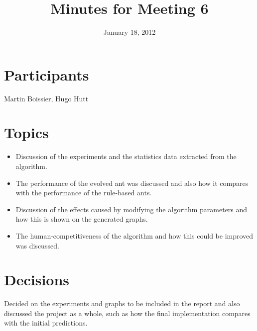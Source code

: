 \documentclass[a4paper, 11pt]{article}
\date{January 18, 2012}
\title{Minutes for Meeting 6}
\begin{document}
\maketitle

\section{Participants}

Martin Boissier, Hugo Hutt

\section{Topics}

\begin{itemize}
\item Discussion of the experiments and the statistics data extracted
  from the algorithm.
\item The performance of the evolved ant was discussed and also how it
  compares with the performance of the rule-based ants.
\item Discussion of the effects caused by modifying the algorithm
  parameters and how this is shown on the generated graphs.
\item The human-competitiveness of the algorithm and how this could be
  improved was discussed.
\end{itemize}

\section{Decisions}

Decided on the experiments and graphs to be included in the report and
also discussed the project as a whole, such as how the final
implementation compares with the initial predictions.
\end{document}
